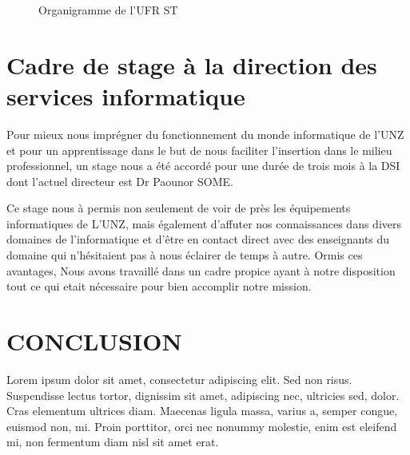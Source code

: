 \begin{figure}[H]%
    \center%
    \setlength{\fboxsep}{5pt}%
    \setlength{\fboxrule}{0.5pt}%
    \caption{Organigramme de l'UFR ST}%
\end{figure}


\section{Cadre de stage à la direction des services informatique}
Pour mieux nous imprégner du fonctionnement du monde informatique de l’UNZ et pour un apprentissage dans le but de nous faciliter l’insertion dans le milieu professionnel, un stage nous a été accordé pour une durée de trois mois à la DSI dont l’actuel directeur est Dr Paounor SOME. \par

Ce stage nous à permis non seulement de voir de près les équipements informatiques de L’UNZ, mais également d’affuter nos connaissances dans divers domaines de l’informatique et d’\^etre en contact direct avec des enseignants du domaine qui n’hésitaient pas à nous éclairer de temps à autre. 
Ormis ces avantages, Nous avons travaillé dans un cadre propice ayant à notre disposition tout ce qui etait nécessaire pour bien accomplir notre mission.

\section*{CONCLUSION}
Lorem ipsum dolor sit amet, consectetur adipiscing elit. Sed non risus. Suspendisse lectus tortor, dignissim sit amet, adipiscing nec, ultricies sed, dolor. Cras elementum ultrices diam. Maecenas ligula massa, varius a, semper congue, euismod non, mi. Proin porttitor, orci nec nonummy molestie, enim est eleifend mi, non fermentum diam nisl sit amet erat. 